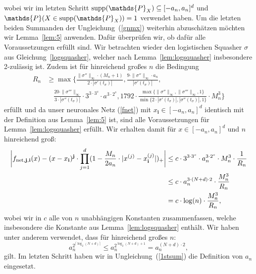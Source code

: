 wobei wir im letzten Schritt $\supp(\mathds{P}_X) \subseteq [-a_n, a_n]^d$ und $\mathds{P}(X \in \supp(\mathds{P}_X)) = 1$ verwendet haben. Um die letzten beiden Summanden der Ungleichung~(\ref{gnmx}) weiterhin abzuschätzen möchten wir Lemma~\ref{lem:5} anwenden. Dafür überprüfen wir, ob dafür alle Voraussetzungen erfüllt sind. Wir betrachten wieder den logistischen Squasher $\sigma$ aus Gleichung~\ref{logsquasher}, welcher nach Lemma~\ref{lem:logsquasher} insbesondere 2-zulässig ist. Zudem ist für hinreichend großes $n$ die Bedingung 
\begin{equation*}
\begin{split}
R_n & \geq \max\biggl\{\frac{\|\sigma''\|_{\infty} \cdot (M_n + 1)}{2 \cdot |\sigma'(t_{\sigma})|}, \frac{9 \cdot \|\sigma''\|_{\infty} \cdot a_n}{|\sigma'(t_{\sigma})|}, \\
& \quad \frac{20 \cdot \|\sigma'''\|_{\infty}}{3 \cdot |\sigma''(t_{\sigma})|} \cdot 3^{3 \cdot 3^s} \cdot a^{3 \cdot 2^s}, 1792 \cdot \frac{\max\{\|\sigma''\|_{\infty},\|\sigma'''\|_{\infty}, 1\}}{\min\{2 \cdot |\sigma'(t_{\sigma})|, |\sigma''(t_{\sigma})|, 1\}} \cdot M_n^3 \biggr\}
\end{split}
\end{equation*}
erfüllt und da unser neuronales Netz (\ref{fnet}) mit $x_{\mathbf{i}} \in [-a_n, a_n]^d$ identisch mit der Definition aus Lemma~\ref{lem:5} ist, sind alle Voraussetzungen für Lemma~\ref{lem:logsquasher} erfüllt.
Wir erhalten damit für $x \in [-a_n ,a_n]^d$ und $n$ hinreichend groß:
\begin{equation}
\label{vorbereitung}
\begin{split}
\bigg| f_{\mathrm{net},\mathbf{j},\mathbf{i}}(x) - (x - x_{\mathbf{i}})^{\mathbf{j}} \cdot \prod_{j = 1}^d(1 - \frac{M_n}{2a_n} \cdot |x^{(j)} - x_{\mathbf{i}}^{(j)}|)_+ \bigg| & \leq c \cdot 3^{3 \cdot 3^s} \cdot a_n^{3 \cdot 2^s} \cdot M_n^3 \cdot \frac{1}{R_n} \\
& \leq c\cdot a_n^{3 \cdot (N + d) \cdot 2} \cdot \frac{M_n^3}{R_n} \\
& = c\cdot \log(n) \cdot \frac{M_n^3}{R_n},  
\end{split}
\end{equation}
wobei wir in $c$ alle von $n$ unabhängigen Konstanten zusammenfassen, welche insbesondere die Konstante aus Lemma~\ref{lem:logsquasher} enthält.
Wir haben unter anderem verwendet, dass für hinreichend großes $n$:
$$a_n^{2^{\lceil\log_2(N + d)\rceil}} \leq a_n^{2^{\log_2(N + d) + 1}} = a_n^{(N + d) \cdot 2},$$ gilt. Im letzten Schritt haben wir in Ungleichung~(\ref{1stsum}) die Definition von $a_n$ eingesetzt. 

